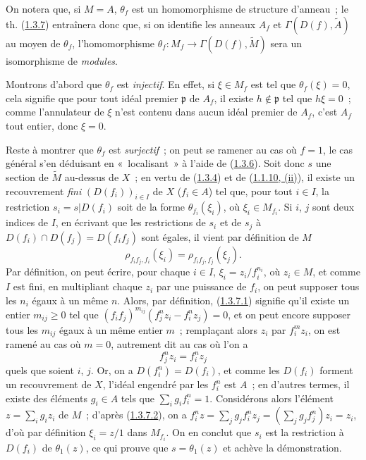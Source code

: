 On notera que, si $M=A$, $\theta_f$ est un homomorphisme de structure
d'anneau~; le th. (\hyperref[I.1.3.7-fr]{1.3.7}) entraînera donc que, si on
identifie les anneaux $A_f$ et $\Gamma(D(f),\widetilde{A})$ au moyen de
$\theta_f$, l'homomorphisme
$\theta_f:M_f\to\Gamma(D(f),\widetilde{M})$ sera un isomorphisme de
\emph{modules}.

Montrons d'abord que $\theta_f$ est \emph{injectif}. En effet, si
$\xi\in M_f$ est tel que $\theta_f(\xi)=0$, cela signifie que pour tout idéal
premier $\mathfrak{p}$ de $A_f$, il existe $h\notin\mathfrak{p}$ tel que
$h\xi=0$~; comme l'annulateur de $\xi$ n'est contenu dans aucun idéal premier
de $A_f$, c'est $A_f$ tout entier, donc $\xi=0$.

Reste à montrer que $\theta_f$ est \emph{surjectif}~; on peut se ramener au
cas où $f=1$, le cas général s'en déduisant en «~localisant~» à l'aide de
(\hyperref[I.1.3.6-fr]{1.3.6}). Soit donc $s$ une section de $\widetilde{M}$
au-dessus de $X$~; en vertu de (\hyperref[I.1.3.4-fr]{1.3.4}) et de
(\hyperref[I.1.1.10-fr]{1.1.10, (ii)}), il existe un recouvrement
\emph{fini} $(D(f_i))_{i\in I}$ de $X$ ($f_i\in A$) tel que, pour tout
$i\in I$, la restriction $s_i=s|D(f_i)$ soit de la forme
$\theta_{f_i}(\xi_i)$, où $\xi_i\in M_{f_i}$. Si $i$, $j$ sont deux indices
de $I$, en écrivant que les restrictions de $s_i$ et de $s_j$ à
$D(f_i)\cap D(f_j)=D(f_i f_j)$ sont égales, il vient par définition de
$M$
\begin{equation}
  \rho_{f_i f_j,f_i}(\xi_i)=\rho_{f_i f_j,f_j}(\xi_j).
  \tag{1.3.7.1}\label{I.1.3.7.1-fr}
\end{equation}
Par définition, on peut écrire, pour chaque $i\in I$,
$\xi_i=z_i/f_i^{n_i}$, où $z_i\in M$, et comme $I$ est fini, en multipliant
chaque $z_i$ par une puissance de $f_i$, on peut supposer tous les $n_i$
égaux à un même $n$. Alors, par définition, (\hyperref[I.1.3.7.1-fr]{1.3.7.1})
signifie qu'il existe un entier $m_{ij}\geq0$ tel que
$(f_i f_j)^{m_{ij}}(f_j^n z_i-f_i^n z_j)=0$, et on peut encore supposer tous
les $m_{ij}$ égaux à un même entier $m$~; remplaçant alors $z_i$ par
$f_i^m z_i$, on est ramené au cas où $m=0$, autrement dit au cas où l'on a
\begin{equation}
  f_j^n z_i=f_i^n z_j
  \tag{1.3.7.2}\label{I.1.3.7.2-fr}
\end{equation}
quels que soient $i$, $j$. Or, on a $D(f_i^n)=D(f_i)$, et comme les $D(f_i)$
forment un recouvrement de $X$, l'idéal engendré par les $f_i^n$ est $A$~;
en d'autres termes, il existe des éléments $g_i\in A$ tels que
$\sum_i g_i f_i^n=1$. Considérons alors l'élément
$z=\sum_i g_i z_i$ de $M$~; d'après (\hyperref[I.1.3.7.2-fr]{1.3.7.2}), on a
$f_i^n z=\sum_j g_j f_i^n z_j=(\sum_j g_j f_j^n)z_i=z_i$, d'où par
définition $\xi_i=z/1$ dans $M_{f_i}$. On en conclut
que $s_i$ est la restriction à $D(f_i)$ de $\theta_1(z)$, ce qui prouve que
$s=\theta_1(z)$ et achève la démonstration.

